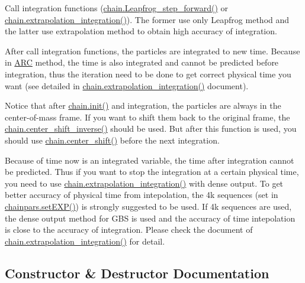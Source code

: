 \begin{DoxyEnumerate}
\item Call integration functions (\hyperlink{classARC_1_1chain_a82b26731761231d86fd2e0b4529df6fa}{chain.\+Leapfrog\+\_\+step\+\_\+forward()} or \hyperlink{classARC_1_1chain_ab831215debbd09466cadb1b961dd0a18}{chain.\+extrapolation\+\_\+integration()}). The former use only Leapfrog method and the latter use extrapolation method to obtain high accuracy of integration.
\item After call integration functions, the particles are integrated to new time. Because in \hyperlink{namespaceARC}{A\+RC} method, the time is also integrated and cannot be predicted before integration, thus the iteration need to be done to get correct physical time you want (see detailed in \hyperlink{classARC_1_1chain_ab831215debbd09466cadb1b961dd0a18}{chain.\+extrapolation\+\_\+integration()} document).
\item Notice that after \hyperlink{classARC_1_1chain_aa016cf633d19079dca24565b80a36a3f}{chain.\+init()} and integration, the particles are always in the center-\/of-\/mass frame. If you want to shift them back to the original frame, the \hyperlink{classARC_1_1chain_a52edc1843550578f5be5590b7403ef97}{chain.\+center\+\_\+shift\+\_\+inverse()} should be used. But after this function is used, you should use \hyperlink{classARC_1_1chain_a68ae268afb418455bfdd6e8101b3b4eb}{chain.\+center\+\_\+shift()} before the next integration.
\end{DoxyEnumerate}

Because of time now is an integrated variable, the time after integration cannot be predicted. Thus if you want to stop the integration at a certain physical time, you need to use \hyperlink{classARC_1_1chain_ab831215debbd09466cadb1b961dd0a18}{chain.\+extrapolation\+\_\+integration()} with dense output. To get better accuracy of physical time from intepolation, the 4k sequences (set in \hyperlink{classARC_1_1chainpars_a1cacdcfc2d5b91f27cbc3c58cc8d3447}{chainpars.\+set\+E\+X\+P()}) is strongly suggested to be used. If 4k sequences are used, the dense output method for G\+BS is used and the accuracy of time intepolation is close to the accuracy of integration. Please check the document of \hyperlink{classARC_1_1chain_ab831215debbd09466cadb1b961dd0a18}{chain.\+extrapolation\+\_\+integration()} for detail. 

\subsection{Constructor \& Destructor Documentation}
\hypertarget{classARC_1_1chain_a38fc886b32c9496571b1649e784583a3}{}\label{classARC_1_1chain_a38fc886b32c9496571b1649e784583a3} 
